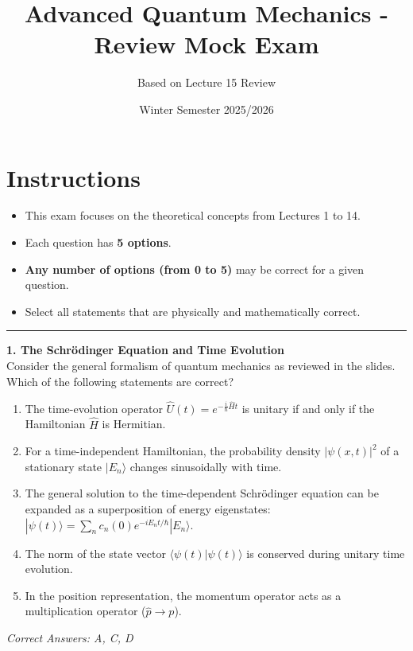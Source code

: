 \documentclass[a4paper,11pt]{article}
\title{\textbf{Advanced Quantum Mechanics - Review Mock Exam}}
\author{Based on Lecture 15 Review}
\date{Winter Semester 2025/2026}
\begin{document}
\maketitle

\section*{Instructions}
\begin{itemize}
    \item This exam focuses on the theoretical concepts from Lectures 1 to 14.
    \item Each question has \textbf{5 options}.
    \item \textbf{Any number of options (from 0 to 5)} may be correct for a given question.
    \item Select all statements that are physically and mathematically correct.
\end{itemize}

\hrule
\vspace{1cm}

\noindent\textbf{1. The Schrödinger Equation and Time Evolution}\\
Consider the general formalism of quantum mechanics as reviewed in the slides. Which of the following statements are correct?

\begin{enumerate}[label=\Alph*.]
    \item The time-evolution operator $\hat{U}(t) = e^{-\frac{i}{\hbar}\hat{H}t}$ is unitary if and only if the Hamiltonian $\hat{H}$ is Hermitian.
    \item For a time-independent Hamiltonian, the probability density $|\psi(x,t)|^2$ of a stationary state $|E_n\rangle$ changes sinusoidally with time.
    \item The general solution to the time-dependent Schrödinger equation can be expanded as a superposition of energy eigenstates: $|\psi(t)\rangle = \sum_n c_n(0) e^{-iE_n t/\hbar} |E_n\rangle$.
    \item The norm of the state vector $\langle \psi(t) | \psi(t) \rangle$ is conserved during unitary time evolution.
    \item In the position representation, the momentum operator acts as a multiplication operator ($\hat{p} \to p$).
\end{enumerate}
\textit{Correct Answers: A, C, D}

\vspace{0.5cm}
\end{document}
